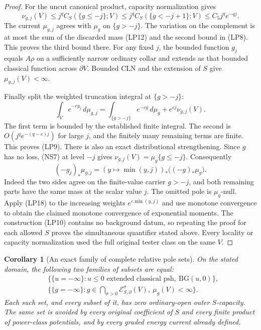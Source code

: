 \documentclass[11pt,a4paper]{article}
\numberwithin{equation}{section}
\newtheorem{corollary}[theorem]{Corollary}
\theoremstyle{definition}
\theoremstyle{remark}
\begin{document}
\begin{proof}
For the uncut canonical product, capacity normalization gives
\[
 \nu_{g,j}(V)
       \leq j^q C_S(\{g\leq-j\};V)
       \leq j^q C_S(\{g<-j+1\};V)
       \leq C_5j^q e^{-qj}.
 \tag{LP12}
\]
The current $\mu_{g,j}$ agrees with $\mu_g$ on $\{g>-j\}$.
The variation on the complement is at most the sum of the
discarded mass (LP12) and the second bound in (LP8). This
proves the third bound there. For any fixed $j$, the bounded
function $g_j$ equals $A\rho$ on a sufficiently narrow
ordinary collar and extends as that bounded classical function
across $\partial V$. Bounded CLN and the extension of $S$
give $\mu_{g,j}(V)<\infty$.

Finally split the weighted truncation integral at $\{g>-j\}$:
\[
 \int_V e^{-cg_j}\,d\mu_{g,j}
    =\int_{\{g>-j\}}e^{-cg}\,d\mu_g
                            +e^{cj}\nu_{g,j}(V).
 \tag{LP13}
\]
The first term is bounded by the established finite integral.
The second is $O(j^q e^{-(q-c)j})$ for large $j$, and the
finitely many remaining terms are finite. This proves (LP9).
There is also an exact distributional strengthening. Since
$g$ has no loss, (NS7) at level $-j$ gives
$\nu_{g,j}(V)=\mu_g\{g\leq-j\}$. Consequently
\[
 (-g_j)_*\mu_{g,j}
       =(y\mapsto\min(y,j))_*\bigl((-g)_*\mu_g\bigr).
 \tag{LP18}
\]
Indeed the two sides agree on the finite-value carrier $g>-j$,
and both remaining parts have the same mass at the scalar value
$j$. The omitted pole is $\mu_g$-null. Apply (LP18) to the
increasing weights $e^{c\min(y,j)}$ and use monotone convergence
to obtain the claimed monotone convergence of exponential
moments. The construction (LP10) contains no background datum,
so repeating the proof for each allowed $S$ proves the simultaneous
quantifier stated above.
Every locality or capacity normalization used the full original
tester class on the same $V$.
\end{proof}

\begin{corollary}[An exact family of complete relative pole sets]
\label{cor:r11-all-power-complete-poles}
On the stated domain, the following two families of subsets
are equal:
\[
 \begin{split}
 &\bigl\{\{u=-\infty\}:u\leq0\text{ extended classical psh},
                                  \ \mathrm{BG}(u,0)\bigr\},\\
 &\bigl\{\{g=-\infty\}:g\in\bigcap_{\sigma>0}
       \mathcal E^\sigma_{S,\partial}(V),\ \mu_g(V)<\infty\bigr\}.
 \end{split}
 \tag{LP14}
\]
Each such set, and every subset of it, has zero ordinary-open
outer $S$-capacity. The same set is avoided by every original
coefficient of $S$ and every finite product of power-class
potentials, and by every graded energy current already defined.
\end{corollary}
\end{document}
